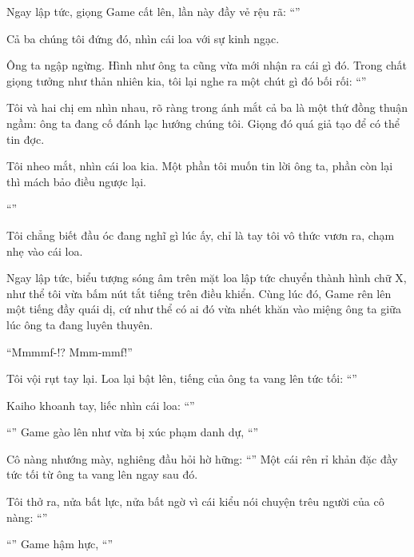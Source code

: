 \documentclass[../main.tex]{subfiles}
\begin{document}

Ngay lập tức, giọng Game cất lên, lần này đầy vẻ rệu rã: ``''

Cả ba chúng tôi đứng đó, nhìn cái loa với sự kinh ngạc.

Ông ta ngập ngừng. Hình như ông ta cũng vừa mới nhận ra cái gì đó. Trong chất giọng tưởng như thản nhiên kia, tôi lại nghe ra một chút gì đó bối rối: ``''

Tôi và hai chị em nhìn nhau, rõ ràng trong ánh mắt cả ba là một thứ đồng thuận ngầm: ông ta đang cố đánh lạc hướng chúng tôi. Giọng đó quá giả tạo để có thể tin đợc.

Tôi nheo mắt, nhìn cái loa kia. Một phần tôi muốn tin lời ông ta, phần còn lại thì mách bảo điều ngược lại.

``''

Tôi chẳng biết đầu óc đang nghĩ gì lúc ấy, chỉ là tay tôi vô thức vươn ra, chạm nhẹ vào cái loa.

Ngay lập tức, biểu tượng sóng âm trên mặt loa lập tức chuyển thành hình chữ X, như thể tôi vừa bấm nút tắt tiếng trên điều khiển. Cùng lúc đó, Game rên lên một tiếng đầy quái dị, cứ như thể có ai đó vừa nhét khăn vào miệng ông ta giữa lúc ông ta đang luyên thuyên.


``Mmmmf-!? Mmm-mmf!''

Tôi vội rụt tay lại. Loa lại bật lên, tiếng của ông ta vang lên tức tối: ``''

Kaiho khoanh tay, liếc nhìn cái loa: ``''

``'' Game gào lên như vừa bị xúc phạm danh dự, ``''

Cô nàng nhướng mày, nghiêng đầu hỏi hờ hững: ``'' Một cái rên rỉ khản đặc đầy tức tối từ ông ta vang lên ngay sau đó.

Tôi thở ra, nửa bất lực, nửa bất ngờ vì cái kiểu nói chuyện trêu người của cô nàng: ``''

``'' Game hậm hực, ``''
\end{document}

